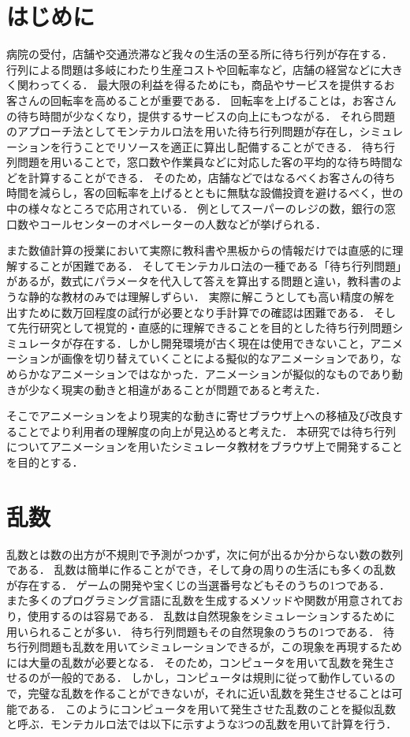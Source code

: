 \documentclass[12pt,a4j]{ltjsarticle}
\begin{document}
\section{はじめに}
病院の受付，店舗や交通渋滞など我々の生活の至る所に待ち行列が存在する．
行列による問題は多岐にわたり生産コストや回転率など，店舗の経営などに大きく関わってくる．
最大限の利益を得るためにも，商品やサービスを提供するお客さんの回転率を高めることが重要である．
回転率を上げることは，お客さんの待ち時間が少なくなり，提供するサービスの向上にもつながる．
それら問題のアプローチ法としてモンテカルロ法を用いた待ち行列問題が存在し，シミュレーションを行うことでリソースを適正に算出し配備することができる．
待ち行列問題を用いることで，窓口数や作業員などに対応した客の平均的な待ち時間などを計算することができる．
そのため，店舗などではなるべくお客さんの待ち時間を減らし，客の回転率を上げるとともに無駄な設備投資を避けるべく，世の中の様々なところで応用されている．
例としてスーパーのレジの数，銀行の窓口数やコールセンターのオペレーターの人数などが挙げられる\cite{soumu}．

また数値計算の授業において実際に教科書や黒板からの情報だけでは直感的に理解することが困難である．
そしてモンテカルロ法の一種である「待ち行列問題」があるが，数式にパラメータを代入して答えを算出する問題と違い，教科書のような静的な教材のみでは理解しずらい．
実際に解こうとしても高い精度の解を出すために数万回程度の試行が必要となり手計算での確認は困難である．
そして先行研究として視覚的・直感的に理解できることを目的とした待ち行列問題シミュレータが存在する\cite{sotuken16}．しかし開発環境が古く現在は使用できないこと，アニメーションが画像を切り替えていくことによる擬似的なアニメーションであり，なめらかなアニメーションではなかった．アニメーションが擬似的なものであり動きが少なく現実の動きと相違があることが問題であると考えた．

そこでアニメーションをより現実的な動きに寄せブラウザ上への移植及び改良することでより利用者の理解度の向上が見込めると考えた．
本研究では待ち行列についてアニメーションを用いたシミュレータ教材をブラウザ上で開発することを目的とする．
\clearpage

\section{乱数}
乱数とは数の出方が不規則で予測がつかず，次に何が出るか分からない数の数列である．
乱数は簡単に作ることができ，そして身の周りの生活にも多くの乱数が存在する．
ゲームの開発や宝くじの当選番号などもそのうちの1つである．
また多くのプログラミング言語に乱数を生成するメソッドや関数が用意されており，使用するのは容易である．
乱数は自然現象をシミュレーションするために用いられることが多い．
待ち行列問題もその自然現象のうちの1つである．
待ち行列問題も乱数を用いてシミュレーションできるが，この現象を再現するためには大量の乱数が必要となる．
そのため，コンピュータを用いて乱数を発生させるのが一般的である．
しかし，コンピュータは規則に従って動作しているので，完璧な乱数を作ることができないが，それに近い乱数を発生させることは可能である．
このようにコンピュータを用いて発生させた乱数のことを擬似乱数と呼ぶ．モンテカルロ法では以下に示すような3つの乱数を用いて計算を行う．
\end{document}
